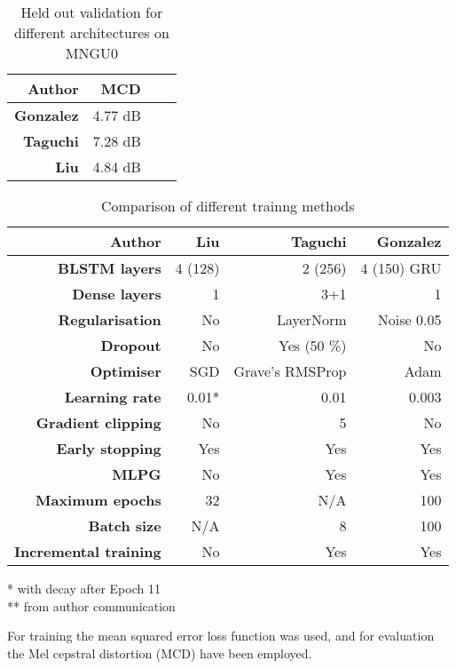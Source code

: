 \documentclass[a4paper]{article}
\begin{document}
\begin{table}[th]
  \caption{Held out validation for different architectures on MNGU0}
  \label{tab:pilot}
  \centering
  \footnotesize

  \begin{tabular}{ r r r r }
    \toprule
    \textbf{Author} & \textbf{MCD} \\
    \midrule
    \textbf{Gonzalez} & 4.77 dB \\
    \textbf{Taguchi} & 7.28 dB \\
    \textbf{Liu} & 4.84 dB \\
    \bottomrule
  \end{tabular}
\end{table}

\begin{table}[th]
  \caption{Comparison of different trainng methods}
  \label{tab:architectures}
  \centering
  \footnotesize

  \begin{tabular}{ r r r r }
    \toprule
    \textbf{Author} & \textbf{Liu} & \textbf{Taguchi} & \textbf{Gonzalez} \\
    \midrule
    \textbf{BLSTM layers} & 4 (128) & 2 (256) & 4 (150) GRU \\
    \textbf{Dense layers} & 1 & 3+1 & 1 \\
    \textbf{Regularisation} & No & LayerNorm & Noise 0.05 \\
    \textbf{Dropout} & No & Yes (50 \%) & No \\
    \textbf{Optimiser} & SGD & Grave's RMSProp & Adam \\
    \textbf{Learning rate} & 0.01* & 0.01 & 0.003 \\
    \textbf{Gradient clipping} & No & 5 & No \\
    \textbf{Early stopping} & Yes & Yes & Yes \\
    \textbf{MLPG} \cite{Wu2016} & No & Yes & Yes \\ 
    \textbf{Maximum epochs} & 32 & N/A & 100 \\
    \textbf{Batch size} & N/A & 8 & 100 \\
    \textbf{Incremental training} & No & Yes & Yes \\
    \bottomrule
  \end{tabular}
  * with decay after Epoch 11 \\
  ** from author communication
\end{table}

For training the mean squared error loss function was used, and for
evaluation the Mel cepstral distortion (MCD) have been employed. \cite{Kubichek1993}
\end{document}
